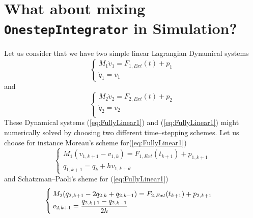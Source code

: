 \section{What about mixing {\tt OnestepIntegrator} in Simulation?}
\label{Sec:MisingOSI}
Let us consider that we have two simple linear Lagrangian Dynamical systems
\begin{equation}
  \label{eq:FullyLinear1}
  \begin{cases}
    M_1 \dot v_1  = F_{1,Ext}(t) + p_1   \\
    \dot q_1 = v_1 
  \end{cases}
\end{equation}
and
\begin{equation}
  \label{eq:FullyLinear1}
  \begin{cases}
    M_2 \dot v_2   = F_{2,Ext}(t) + p_2  \\
    \dot q_2 = v_2 \\
  \end{cases}
\end{equation}
These Dynamical systems (\ref{eq:FullyLinear1}) and (\ref{eq:FullyLinear1}) might numerically solved by choosing two different time--stepping schemes. Let us choose for instance Moreau's scheme for(\ref{eq:FullyLinear1}) 
\begin{equation}
  \label{eq:FullyLinear1-TS}
  \begin{cases}
    M_1 (v_{1,k+1}-v_{1,k})  = F_{1,Ext}(t_{k+1}) + p_{1,k+1}   \\
    q_{1,k+1} = q_{k}+ h  v_{1,k+\theta} 
  \end{cases}
\end{equation}
and Schatzman--Paoli's sheme for (\ref{eq:FullyLinear1}) 
\begin{equation}
  \label{eq:FullyLinear1-TS}
  \begin{cases}
    M_2(q_{2,k+1}-2q_{2,k}+q_{2,k-1})  = F_{2,Ext}(t_{k+1}) + p_{2,k+1}  \\
    v_{2,k+1} = \displaystyle \frac{q_{2,k+1}-q_{2,k-1}}{2h} \\
  \end{cases}
\end{equation}


